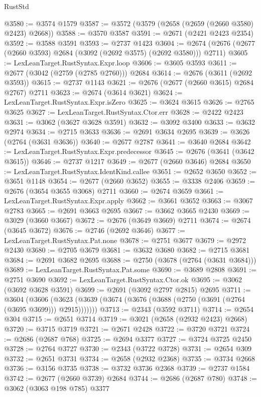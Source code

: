 \begin{lexlean}{RustStd}
\begin{coremodule}
@3580 := @3574 @1579
@3587 := @3572 (@3579 (@2658 (@2659 (@2660 @3580) @2423) @2668))
@3588 := @3570 @3587
@3591 := @2671 (@2421 @2423 @2354)
@3592 := @3588 @3591
@3593 := @2737 @1423
@3604 := @2674 (@2676 (@2677 (@2660 @3593) @2684 (@3092 (@2692 @3575) (@2692 @3580))) @2711)
@3605 := LexLeanTarget.RustSyntax.Expr.loop
@3606 := @3605 @3593
@3611 := @2677 (@3042 (@2759 (@2785 @2760))) @2684
@3614 := @2676 (@3611 (@2692 @3593))
@3615 := @2737 @1143
@3621 := @2676 (@2677 (@2660 @3615) @2684 @2767) @2711
@3623 := @2674 (@3614 @3621)
@3624 := LexLeanTarget.RustSyntax.Expr.isZero
@3625 := @3624 @3615
@3626 := @2765 @3625
@3627 := LexLeanTarget.RustSyntax.Ctor.err
@3628 := @2422 @2423
@3631 := @3062 (@3627 @3628 @3591)
@3632 := @3092 @3400
@3633 := @3632 @2974
@3634 := @2715 @3633
@3636 := @2691 @3634 @2695
@3639 := @3626 (@2764 (@3631 @3636))
@3640 := @2677 @2787
@3641 := @3640 @2684
@3642 := LexLeanTarget.RustSyntax.Expr.predecessor
@3645 := @2676 (@3641 (@3642 @3615))
@3646 := @2737 @1217
@3649 := @2677 (@2660 @3646) @2684
@3650 := LexLeanTarget.RustSyntax.IdentKind.callee
@3651 := @2652 @3650
@3652 := @3651 @1148
@3654 := @2677 (@2660 @3652)
@3655 := @3338 @2406
@3659 := @2676 (@3654 @3655 @3068) @2711
@3660 := @2674 @3659
@3661 := LexLeanTarget.RustSyntax.Expr.apply
@3662 := @3661 @3652
@3663 := @3067 @2783
@3665 := @2691 @3663 @2695
@3667 := @3662 @3665 @2430
@3669 := @3029 (@3660 @3667)
@3672 := @2676 (@3649 @3669) @2711
@3674 := @2674 (@3645 @3672)
@3676 := @2746 (@2692 @3646)
@3677 := LexLeanTarget.RustSyntax.Pat.none
@3678 := @2751 @3677
@3679 := @2972 @2430
@3680 := @2705 @3679
@3681 := @3632 @3680
@3682 := @2715 @3681
@3684 := @2691 @3682 @2695
@3688 := @2750 (@3678 (@2764 (@3631 @3684)))
@3689 := LexLeanTarget.RustSyntax.Pat.some
@3690 := @3689 @2808
@3691 := @2751 @3690
@3692 := LexLeanTarget.RustSyntax.Ctor.ok
@3695 := @3062 (@3692 @3628 @3591)
@3699 := @2691 (@3092 @2797 @2815) @2695
@3711 := @3604
    (@3606 (@3623 (@3639 (@3674 (@3676 (@3688 (@2750 (@3691 (@2764 (@3695 @3699))) @2915)))))))
@3713 := @2343 (@3592 @3711)
@3714 := @2654 @304
@3715 := @2651 @3714
@3719 := @3021 (@2658 (@2932 @2423) @2668)
@3720 := @3715 @3719
@3721 := @2671 @2428
@3722 := @3720 @3721
@3724 := @2686 (@2687 @768)
@3725 := @2694 @3377
@3727 := @3724 @3725 @2450
@3728 := @2764 @3727
@3730 := @2343 (@3722 @3728)
@3731 := @2654 @309
@3732 := @2651 @3731
@3734 := @2658 (@2932 @2368)
@3735 := @3734 @2668
@3736 := @3156 @3735
@3738 := @3732 @3736 @2368
@3739 := @2737 @1584
@3742 := @2677 (@2660 @3739) @2684
@3744 := @2686 (@2687 @780)
@3748 := @3062 (@3063 @198 @785) @3377

\end{coremodule}
\end{lexlean}
